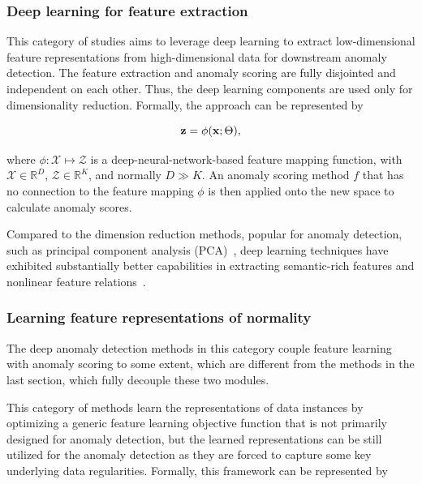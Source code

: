 \subsubsection{Deep learning for feature extraction}
\label{ch:background:sec:anomalydetection:subsec:deepanomaly:subsubsecfeature}
This category of studies aims to leverage deep learning to extract low-dimensional feature representations from high-dimensional data for downstream anomaly detection. The feature extraction and anomaly scoring are fully disjointed and independent on each other. Thus, the deep learning components are used only for dimensionality reduction. Formally, the approach can be represented by

\begin{equation}\label{eqn:featureextraction}
\centering
\mathbf{z} = \phi(\mathbf{x}; \Theta),
\end{equation}

where $\phi:\mathcal{X} \mapsto \mathcal{Z}$ is a deep-neural-network-based feature mapping function, with $\mathcal{X}\in \mathbb{R}^{D}$, $\mathcal{Z} \in \mathbb{R}^{K}$, and normally $D \gg K$. An anomaly scoring method $f$ that has no connection to the feature mapping $\phi$ is then applied onto the new space to calculate anomaly scores.

Compared to the dimension reduction methods, popular for anomaly detection, such as principal component analysis (PCA)~\cite{jolliffe2016principal}, deep learning techniques have exhibited substantially better capabilities in extracting semantic-rich features and nonlinear feature relations~\cite{bengio2013representation,Goodfellow-et-al-2016}.

\subsubsection{Learning feature representations of normality}\label{ch:background:sec:anomalydetection:subsec:deepanomaly:featuresrepresentations}
The deep anomaly detection methods in this category couple feature learning with anomaly scoring to some extent, which are different from the methods in the last section, which fully decouple these two modules. 

This category of methods learn the representations of data instances by optimizing a generic feature learning objective function that is not primarily designed for anomaly detection, but the learned representations can be still utilized for the anomaly detection as they are forced to capture some key underlying data regularities. Formally, this framework can be represented by

